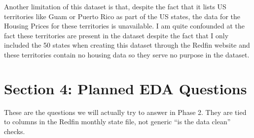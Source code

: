 \documentclass[12pt]{article}
\begin{document}
\begin{enumerate}
		Another limitation of this dataset is that, despite the fact that it lists US territories like Guam or Puerto Rico as part of the US states, the data for the Housing Prices for these territories is unavailable. I am quite confounded at the fact these territories are present in the dataset despite the fact that I only included the 50 states when creating this dataset through the Redfin website and these territories contain no housing data so they serve no purpose in the dataset.
\end{enumerate}
\section{Section 4: Planned EDA Questions}

These are the questions we will actually try to answer in Phase 2. They are tied to columns in the Redfin monthly state file, not generic ``is the data clean'' checks.
\end{document}
